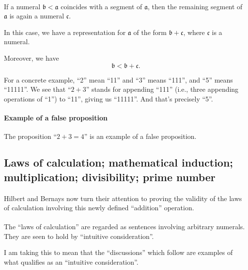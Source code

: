 \paragraph{} %
If a numeral $\mathfrak{b}<\mathfrak{a}$ coincides with a segment of
$\mathfrak{a}$, then the remaining segment of $\mathfrak{a}$ is again
a numeral $\mathfrak{c}$. 

In this case, we have a representation for $\mathfrak{a}$
of the form $\mathfrak{b}+\mathfrak{c}$, where $\mathfrak{c}$ is a
numeral.

Moreover, we have
\begin{equation*}
\mathfrak{b} < \mathfrak{b} + \mathfrak{c}.
\end{equation*}

For a concrete example, ``2'' mean ``11'' and ``3'' means ``111'', and
``5'' means ``11111''. We see that ``$2 + 3$'' stands for appending
``111'' (i.e., three appending operations of ``1'') to ``11'', giving
us ``11111''. And that's precisely ``5''.

\paragraph{Example of a false proposition} %
The proposition ``$2+3=4$'' is an example of a false proposition.

\subsection[Laws of calculation]{Laws of calculation; mathematical induction; multiplication; divisibility; prime number}

\paragraph{} %
Hilbert and Bernays now turn their attention to proving the validity
of the laws of calculation involving this newly defined ``addition''
operation.

\paragraph{} %
The ``laws of calculation'' are regarded as sentences involving
arbitrary numerals. They are seen to hold by ``intuitive consideration''.

I am taking this to mean that the ``discussions'' which follow are
examples of what qualifies as an ``intuitive consideration''.

